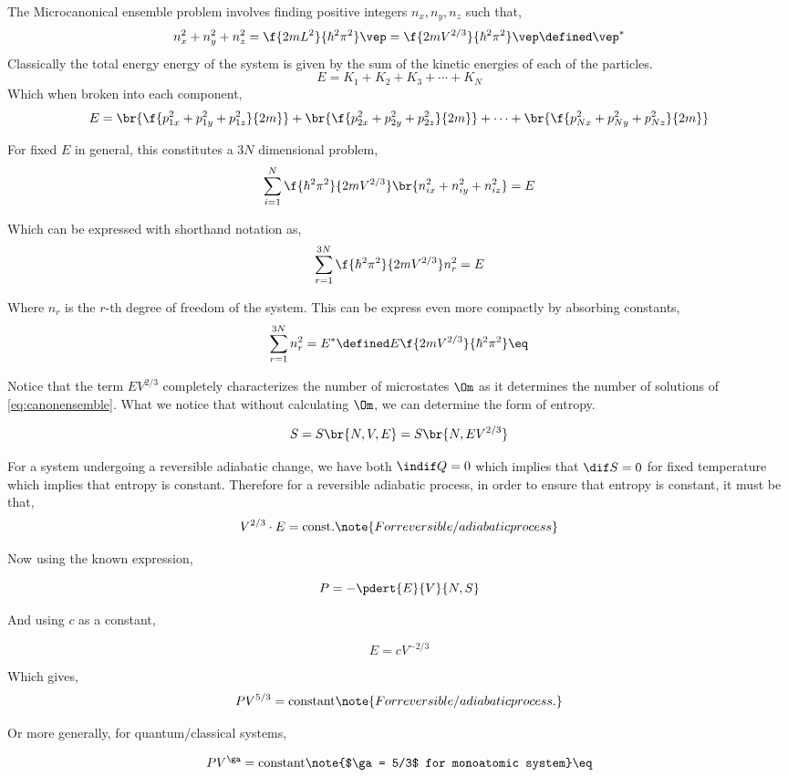 \documentclass{article}
\begin{document}
The Microcanonical ensemble problem involves finding positive integers $n_x, n_y, n_z$ such that,
\[ n_x^2 + n_y^2 + n_z^2 = \f{2mL^2}{\hbar^2 \pi^2} \vep = \f{2mV^{2/3}}{\hbar^2 \pi^2} \vep \defined \vep^* \]
Classically the total energy energy of the system is given by the sum of the kinetic energies of each of the particles.
\[ E = K_1 + K_2 + K_3 + \cdots + K_N \]
Which when broken into each component,
\[ E = \br{\f{p_{1x}^2 + p_{1y}^2 + p_{1z}^2}{2m}} + \br{\f{p_{2x}^2 + p_{2y}^2 + p_{2z}^2}{2m}} + \cdots + \br{\f{p_{Nx}^2 + p_{Ny}^2 + p_{Nz}^2}{2m}} \]

For fixed $E$ in general, this constitutes a $3N$ dimensional problem,
\[ \sum_{i=1}^N \f{\hbar^2 \pi^2}{2 m V^{2/3}} \br{n_{ix}^2 + n_{iy}^2 + n_{iz}^2} = E \]

Which can be expressed with shorthand notation as,
\[ \sum_{r=1}^{3N} \f{\hbar^2 \pi^2}{2 m V^{2/3}} n_{r}^2 = E \]

Where $n_{r}$ is the $r$-th degree of freedom of the system. This can be express even more compactly by absorbing constants,
\[ \sum_{r=1}^{3N} n_{r}^2 = E^* \defined E \f{2 m V^{2/3}}{\hbar^2 \pi^2} \eq \label{eq:canonensemble} \]

Notice that the term $E V^{2/3}$ completely characterizes the number of microstates $\Om$ as it determines the number of solutions of \eqref{eq:canonensemble}. What we notice that without calculating $\Om$, we can determine the form of entropy.

\[ S = S\br{N,V,E} = S\br{N, E V^{2/3}} \]

For a system undergoing a reversible adiabatic change, we have both $\indif Q = 0$ which implies that $\dif S = 0$ for fixed temperature which implies that entropy is constant. Therefore for a reversible adiabatic process, in order to ensure that entropy is constant, it must be that,
\[ V^{2/3} \cdot E = \text{const.} \note{For reversible/adiabatic process} \]

Now using the known expression,

\[ P = - \pdert{E}{V}{N,S} \]

And using $c$ as a constant,

\[ E = c V^{-2/3} \]

Which gives,
\[ PV^{5/3} = \text{constant} \note{For reversible/adiabatic process.} \]

Or more generally, for quantum/classical systems,

\[ PV^\ga = \text{constant} \note{$\ga = 5/3$ for monoatomic system} \eq \label{eq:adiabtic} \]
\end{document}
